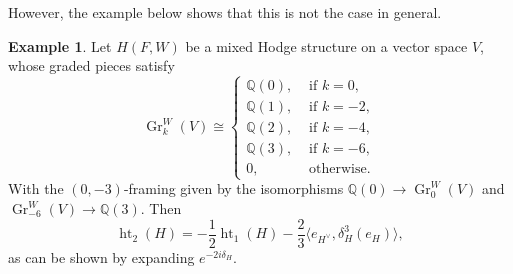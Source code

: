 \documentclass[11pt,a4paper]{amsart}
\newcommand{\Q}{\mathds{Q}}
\DeclareMathOperator {\Gr} {Gr}
\DeclareMathOperator{\Ht}{ht}
\numberwithin{equation}{section}
\theoremstyle{plain}
\theoremstyle{definition}
\newtheorem{ex}[prop]{Example}
\begin{document}
However, the example below shows that this is not the case in general.
\begin{ex}\label{ex-ht}
Let $H(F,W)$ be a mixed Hodge structure on a vector space $V$, whose graded pieces
satisfy
\begin{displaymath}
  \Gr_{k}^{W}(V)\cong
  \begin{cases}
    \Q(0),&\text{ if }k=0,\\
    \Q(1),&\text{ if }k=-2,\\
    \Q(2),&\text{ if }k=-4,\\
   \Q(3),&\text{ if }k=-6,\\
    0,&\text{ otherwise.}
  \end{cases}
\end{displaymath}
With the $(0,-3)$-framing given by the isomorphisms
$\Q(0)\to \Gr_{0}^{W}(V)$ and $\Gr_{-6}^{W}(V) \to \Q(3)$.
Then 
\begin{displaymath}
  \Ht_{2}(H)=-\frac{1}{2}\Ht_{1}(H)-\frac{2}{3}
  \langle e_{H^{\vee}},\delta _{H}^{3}(e_{H})\rangle, 
\end{displaymath}
as can be shown by expanding $e^{-2i\delta_{H}}$.
\end{ex}
\end{document}
